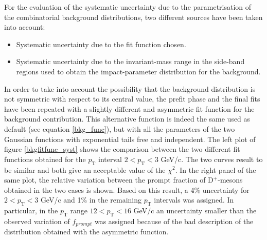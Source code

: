 \documentclass[b5paper,10pt,twoside,oldstyle,classica]{toptesi}
\newcommand{\pt}{p_\text{T}}
\begin{document}
For the evaluation of the systematic uncertainty due to the parametrisation of the combinatorial background distributions, two different sources have been taken into account:
\begin{itemize}
\item Systematic uncertainty due to the fit function chosen.
\item Systematic uncertainty due to the invariant-mass range in the side-band regions used to obtain the impact-parameter distribution for the background.
\end{itemize}
In order to take into account the possibility that the background distribution is not symmetric with respect to its central value, the prefit phase and the final fits have been repeated with a slightly different and asymmetric fit function for the background contribution. This alternative function is indeed the same used as default (see equation \ref{bkg_func}), but with all the parameters of the two Gaussian functions with exponential tails free and independent. The left plot of figure \ref{bkgfitfunc_syst} shows the comparison between the two different fit functions obtained for the $\pt$ interval $2<\pt<3$ GeV/c.
The two curves result to be similar and both give an acceptable value of the $\chi^{2}$. In the right panel of the same plot, the relative variation between the prompt fraction of D$^+$-mesons obtained in the two cases is shown. Based on this result, a 4\% uncertainty for $2<\pt<3$ GeV/c and 1\% in the remaining $\pt$ intervals was assigned. In particular, in the $\pt$ range $12<\pt<16$ GeV/c an uncertainty smaller than the observed variation of $f_{prompt}$ was assigned because of the bad description of the distribution obtained with the asymmetric function.\\\\
\end{document}
